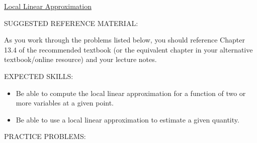 \documentclass[12pt]{article}
\begin{document}
\begin{center}
\underline{\LARGE{Local Linear Approximation}}
\end{center}

\noindent SUGGESTED REFERENCE MATERIAL:

\bigskip

\noindent As you work through the problems listed below, you should reference Chapter 13.4 of the recommended textbook (or the equivalent chapter in your alternative textbook/online resource) and your lecture notes.

\bigskip


\noindent EXPECTED SKILLS:

\begin{itemize}

\item Be able to compute the local linear approximation for a function of two or more variables at a given point.

\item Be able to use a local linear approximation to estimate a given quantity.

\end{itemize}

\noindent PRACTICE PROBLEMS:

\medskip

\end{document}
